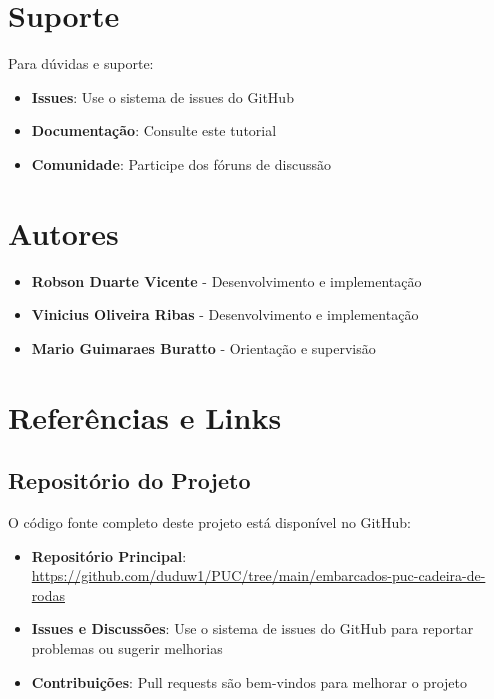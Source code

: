 \documentclass[12pt,a4paper]{article}
\begin{document}
\section{Suporte}

Para dúvidas e suporte:

\begin{itemize}
    \item \textbf{Issues}: Use o sistema de issues do GitHub
    \item \textbf{Documentação}: Consulte este tutorial
    \item \textbf{Comunidade}: Participe dos fóruns de discussão
\end{itemize}

\section{Autores}

\begin{itemize}
    \item \textbf{Robson Duarte Vicente} - Desenvolvimento e implementação
    \item \textbf{Vinicius Oliveira Ribas} - Desenvolvimento e implementação
    \item \textbf{Mario Guimaraes Buratto} - Orientação e supervisão
\end{itemize}

\section{Referências e Links}

\subsection{Repositório do Projeto}

O código fonte completo deste projeto está disponível no GitHub:

\begin{itemize}
    \item \textbf{Repositório Principal}: \url{https://github.com/duduw1/PUC/tree/main/embarcados-puc-cadeira-de-rodas}
    \item \textbf{Issues e Discussões}: Use o sistema de issues do GitHub para reportar problemas ou sugerir melhorias
    \item \textbf{Contribuições}: Pull requests são bem-vindos para melhorar o projeto
\end{itemize}
\end{document}

